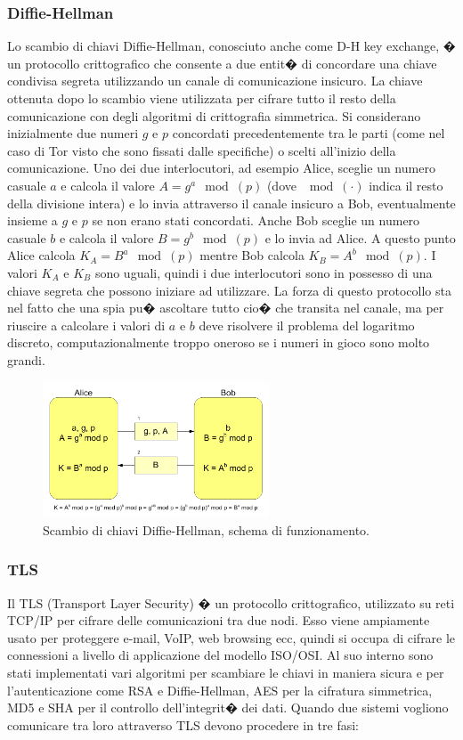 \subsubsection{Diffie-Hellman}
Lo scambio di chiavi Diffie-Hellman, conosciuto anche come D-H key exchange, � un protocollo crittografico che consente a due entit� di concordare una chiave condivisa segreta utilizzando un canale di comunicazione insicuro. La chiave ottenuta dopo lo scambio viene utilizzata per cifrare tutto il resto della comunicazione con degli algoritmi di crittografia simmetrica.
Si considerano inizialmente due numeri $g$ e $p$ concordati precedentemente tra le parti (come nel caso di Tor visto che sono fissati dalle specifiche) o scelti all'inizio della comunicazione. Uno dei due interlocutori, ad esempio Alice, sceglie un numero casuale $a$ e calcola il valore $A=g^a\mod(p)$ (dove $\mod(\cdot)$ indica il resto della divisione intera) e lo invia attraverso il canale insicuro a Bob, eventualmente insieme a $g$ e $p$ se non erano stati concordati. Anche Bob sceglie un numero casuale $b$ e calcola il valore $B=g^b\mod(p)$ e lo invia ad Alice. A questo punto Alice calcola $K_A=B^a\mod(p)$ mentre Bob calcola $K_B=A^b\mod(p)$. I valori $K_A$ e $K_B$ sono uguali, quindi i due interlocutori sono in possesso di una chiave segreta che possono iniziare ad utilizzare. La forza di questo protocollo sta nel fatto che una spia pu� ascoltare tutto cio� che transita nel canale, ma per riuscire a calcolare i valori di $a$ e $b$ deve risolvere il problema del logaritmo discreto, computazionalmente troppo oneroso se i numeri in gioco sono molto grandi.

\begin{figure}[!htbp]
\centering
\includegraphics[width=0.6\textwidth]{./figure//D-H}
\caption{Scambio di chiavi Diffie-Hellman, schema di funzionamento.}
\label{FIG:DH}
\end{figure}

\subsubsection{TLS}
Il TLS (Transport Layer Security) � un protocollo crittografico, utilizzato su reti TCP/IP per cifrare delle comunicazioni tra due nodi. Esso viene ampiamente usato per proteggere e-mail, VoIP, web browsing ecc, quindi si occupa di cifrare le connessioni a livello di applicazione del modello ISO/OSI. Al suo interno sono stati implementati vari algoritmi per scambiare le chiavi in maniera sicura e per l'autenticazione come RSA e Diffie-Hellman, AES per la cifratura simmetrica, MD5 e SHA per il controllo dell'integrit� dei dati. Quando due sistemi vogliono comunicare tra loro attraverso TLS devono procedere in tre fasi:

